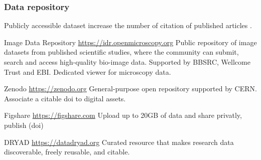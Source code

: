 \documentclass[ignorenonframetext,aspectratio=169,10pt,xcolor=table]{beamer}
\begin{document}
\begin{frame} \frametitle{Data repository}

  Publicly accessible dataset increase the number of citation of published
  articles .

  \begin{block}{Image Data Repository \url{https://idr.openmicroscopy.org}}
    Public repository of image datasets from published scientific studies, where
    the community can submit, search and access high-quality bio-image data.
    Supported by BBSRC, Wellcome Trust and EBI. Dedicated viewer for microscopy data.
  \end{block}

  \begin{block}{Zenodo \url{https://zenodo.org}}
    General-purpose open repository supported by CERN. Associate a citable doi
    to digital assets.
  \end{block}

  \begin{block}{Figshare \url{https://figshare.com}}
    Upload up to 20GB of data and share privatly, publish (doi)
  \end{block}

  \begin{block}{DRYAD \url{https://datadryad.org}}
    Curated resource that makes research data discoverable, freely reusable, and citable.
  \end{block}


\end{frame}



\end{document}
